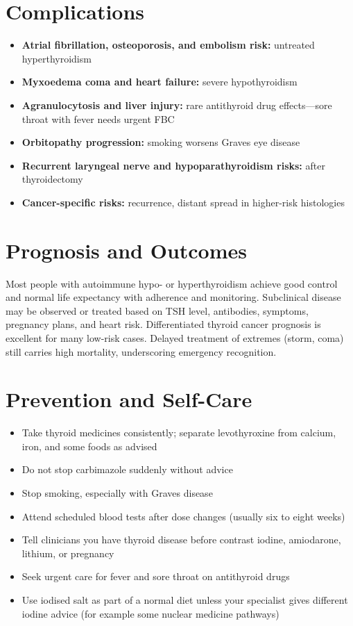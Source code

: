 \section*{Complications}
\begin{itemize}
    \item \textbf{Atrial fibrillation, osteoporosis, and embolism risk:} untreated hyperthyroidism
    \item \textbf{Myxoedema coma and heart failure:} severe hypothyroidism
    \item \textbf{Agranulocytosis and liver injury:} rare antithyroid drug effects---sore throat with fever needs urgent FBC
    \item \textbf{Orbitopathy progression:} smoking worsens Graves eye disease
    \item \textbf{Recurrent laryngeal nerve and hypoparathyroidism risks:} after thyroidectomy
    \item \textbf{Cancer-specific risks:} recurrence, distant spread in higher-risk histologies
\end{itemize}

\section*{Prognosis and Outcomes}
Most people with autoimmune hypo- or hyperthyroidism achieve good control and normal life expectancy with adherence and monitoring. Subclinical disease may be observed or treated based on TSH level, antibodies, symptoms, pregnancy plans, and heart risk. Differentiated thyroid cancer prognosis is excellent for many low-risk cases. Delayed treatment of extremes (storm, coma) still carries high mortality, underscoring emergency recognition.

\section*{Prevention and Self-Care}
\begin{itemize}
    \item Take thyroid medicines consistently; separate levothyroxine from calcium, iron, and some foods as advised
    \item Do not stop carbimazole suddenly without advice
    \item Stop smoking, especially with Graves disease
    \item Attend scheduled blood tests after dose changes (usually six to eight weeks)
    \item Tell clinicians you have thyroid disease before contrast iodine, amiodarone, lithium, or pregnancy
    \item Seek urgent care for fever and sore throat on antithyroid drugs
    \item Use iodised salt as part of a normal diet unless your specialist gives different iodine advice (for example some nuclear medicine pathways)
\end{itemize}


